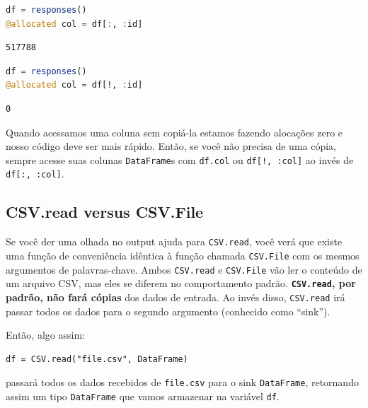\documentclass[
  notoc %
]{tufte-book}
\newcommand{\passthrough}[1]{#1}
\begin{document}
\begin{lstlisting}[language=Julia]
df = responses()
@allocated col = df[:, :id]
\end{lstlisting}

\begin{lstlisting}
517788
\end{lstlisting}

\begin{lstlisting}[language=Julia]
df = responses()
@allocated col = df[!, :id]
\end{lstlisting}

\begin{lstlisting}
0
\end{lstlisting}

Quando acessamos uma coluna sem copiá-la estamos fazendo alocações zero
e nosso código deve ser mais rápido. Então, se você não precisa de uma
cópia, sempre acesse suas colunas \passthrough{\lstinline!DataFrame!}s
com \passthrough{\lstinline!df.col!} ou
\passthrough{\lstinline"df[!, :col]"} ao invés de
\passthrough{\lstinline!df[:, :col]!}.

\hypertarget{sec:df_performance_csv_read_file}{%
\subsection{CSV.read versus
CSV.File}\label{sec:df_performance_csv_read_file}}

Se você der uma olhada no output ajuda para
\passthrough{\lstinline!CSV.read!}, você verá que existe uma função de
conveniência idêntica à função chamada
\passthrough{\lstinline!CSV.File!} com os mesmos argumentos de
palavras-chave. Ambos \passthrough{\lstinline!CSV.read!} e
\passthrough{\lstinline!CSV.File!} vão ler o conteúdo de um arquivo CSV,
mas eles se diferem no comportamento padrão.
\textbf{\passthrough{\lstinline!CSV.read!}, por padrão, não fará cópias}
dos dados de entrada. Ao invés disso, \passthrough{\lstinline!CSV.read!}
irá passar todos os dados para o segundo argumento (conhecido como
``sink'').

Então, algo assim:

\begin{lstlisting}
df = CSV.read("file.csv", DataFrame)
\end{lstlisting}

passará todos os dados recebidos de \passthrough{\lstinline!file.csv!}
para o sink \passthrough{\lstinline!DataFrame!}, retornando assim um
tipo \passthrough{\lstinline!DataFrame!} que vamos armazenar na variável
\passthrough{\lstinline!df!}.
\end{document}
